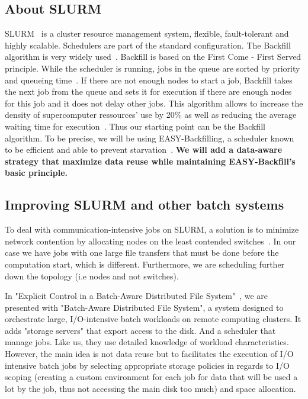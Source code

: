 \documentclass[a4paper]{article}
\begin{document}
\subsection{About SLURM}
SLURM~\cite{SLURM} is a cluster resource management system, flexible, fault-tolerant and highly scalable.
Schedulers are part of the standard configuration. The Backfill algorithm is very widely used~\cite{New_Backfill}.
Backfill is based on the First Come - First Served principle. While the scheduler is running, jobs in the queue are sorted by priority and queueing time~\cite{New_Backfill}.
If there are not enough nodes to start a job, Backfill takes the next job from the queue and sets it for execution if there are enough nodes for this job and 
it does not delay other jobs.
This algorithm allows to increase the density of supercomputer ressources' use by 20\% as well as reducing the average waiting time
for execution~\cite{Maui_Scheduler}.
Thus our starting point can be the Backfill algorithm.
To be precise, we will be using EASY-Backfilling, a scheduler known to be efficient and able to prevent starvation~\cite{easybf}.
\textbf{We will add a data-aware strategy that maximize data reuse while maintaining EASY-Backfill's basic principle.}

\subsection{Improving SLURM and other batch systems}
To deal with communication-intensive jobs on SLURM, a solution is to minimize network contention by allocating nodes on the least
contended switches~\cite{minimize_network_contention}. In our case we have
jobs with one large file transfers that must be done before the computation start, which is different.
Furthermore, we are scheduling further down the topology (i.e nodes and not switches).

In "Explicit Control in a Batch-Aware Distributed File System"~\cite{Explicit_Control_in_a_Batch-Aware_Distributed_File_System},
we are presented with "Batch-Aware Distributed File System", a system designed to orchestrate large, 
I/O-intensive batch workloads on remote computing clusters.
It adds "storage servers" that export access to the disk. And a scheduler that
manage jobs. 
Like us, they use detailed knowledge of workload characteristics.
However, the main idea is not data reuse but to
facilitates the execution of I/O intensive batch
jobs by selecting appropriate storage policies
in regards to I/O scoping (creating a custom environment for each job
for data that will be used a lot by the job, thus not accessing the main disk too
much) and space allocation.
\end{document}
